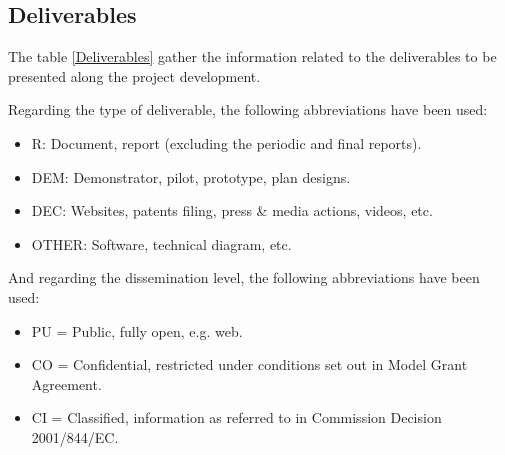 \pagebreak



\subsection{Deliverables}
\label{deliverables}
The table \ref{Deliverables} gather the information related to the deliverables to be presented along the project development.

Regarding the type of deliverable, the following abbreviations have been used:
\begin{itemize}
	\item R: Document, report (excluding the periodic and final reports).
	\item DEM: Demonstrator, pilot, prototype, plan designs.
	\item DEC: Websites, patents filing, press \& media actions, videos, etc.
	\item OTHER: Software, technical diagram, etc.
\end{itemize}

And regarding the dissemination level, the following abbreviations have been used:
\begin{itemize}
	\item PU = Public, fully open, e.g. web.
	\item CO = Confidential, restricted under conditions set out in Model Grant Agreement.
	\item CI = Classified, information as referred to in Commission Decision 2001/844/EC.
\end{itemize}

